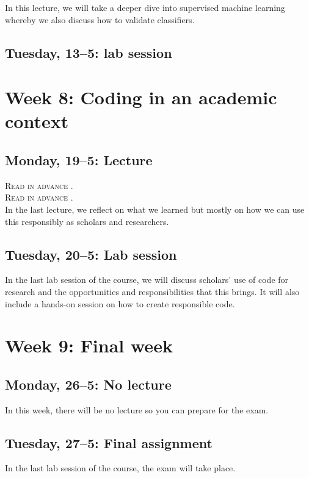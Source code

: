 In this lecture, we will take a deeper dive into supervised machine learning whereby we also discuss how to validate classifiers.

\subsection*{Tuesday, 13--5: lab session}


\section*{Week 8: Coding in an academic context}

\subsection*{Monday, 19--5: Lecture}
\textsc{ Read in advance \cite{hube_understanding_2019}.} \\
\textsc{ Read in advance \cite{bender_dangers_2021}.} \\

In the last lecture, we reflect on what we learned but mostly on how we can use this responsibly as scholars and researchers. 

\subsection*{Tuesday, 20--5: Lab session}
In the last lab session of the course, we will discuss scholars' use of code for research and the opportunities and responsibilities that this brings. It will also include a hands-on session on how to create responsible code.

\section*{Week 9: Final week}

\subsection*{Monday, 26--5: No lecture}
In this week, there will be no lecture so you can prepare for the exam.

\subsection*{Tuesday, 27--5: Final assignment}
In the last lab session of the course, the exam will take place. 

